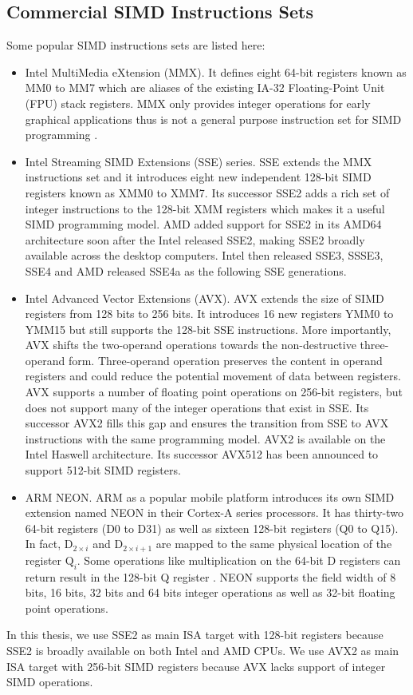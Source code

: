 \subsection{Commercial SIMD Instructions Sets}
Some popular SIMD instructions sets are listed here:
\begin{itemize}
  \item Intel MultiMedia eXtension (MMX). It defines eight 64-bit registers known as MM0 to MM7 which are aliases of the existing IA-32 Floating-Point Unit (FPU) stack registers. MMX only provides integer operations for early graphical applications thus is not a general purpose instruction set for SIMD programming \cite{hua_idisa}.

  \item Intel Streaming SIMD Extensions (SSE) series. SSE extends the MMX instructions set and it introduces eight new independent 128-bit SIMD registers known as XMM0 to XMM7. Its successor SSE2 adds a rich set of integer instructions to the 128-bit XMM registers which makes it a useful SIMD programming model. AMD added support for SSE2 in its AMD64 architecture soon after the Intel released SSE2, making SSE2 broadly available across the desktop computers. Intel then released SSE3, SSSE3, SSE4 and AMD released SSE4a as the following SSE generations.

  \item Intel Advanced Vector Extensions (AVX). AVX extends the size of SIMD registers from 128 bits to 256 bits. It introduces 16 new registers YMM0 to YMM15 but still supports the 128-bit SSE instructions. More importantly, AVX shifts the two-operand operations towards the non-destructive three-operand form. Three-operand operation preserves the content in operand registers and could reduce the potential movement of data between registers. AVX supports a number of floating point operations on 256-bit registers, but does not support many of the integer operations that exist in SSE\@. Its successor AVX2 fills this gap and ensures the transition from SSE to AVX instructions with the same programming model. AVX2 is available on the Intel Haswell architecture. Its successor AVX512 has been announced to support 512-bit SIMD registers.

  \item ARM NEON\@. ARM as a popular mobile platform introduces its own SIMD extension named NEON in their Cortex-A series processors. It has thirty-two 64-bit registers (D0 to D31) as well as sixteen 128-bit registers (Q0 to Q15). In fact, $\text{D}_{2 \times i}$ and $\text{D}_{2 \times i + 1}$ are mapped to the same physical location of the register $\text{Q}_i$. Some operations like multiplication on the 64-bit D registers can return result in the 128-bit Q register \cite{hua_idisa}. NEON supports the field width of 8 bits, 16 bits, 32 bits and 64 bits integer operations as well as 32-bit floating point operations.
\end{itemize}
In this thesis, we use SSE2 as main ISA target with 128-bit registers because SSE2 is broadly available on both Intel and AMD CPUs. We use AVX2 as main ISA target with 256-bit SIMD registers because AVX lacks support of integer SIMD operations.

